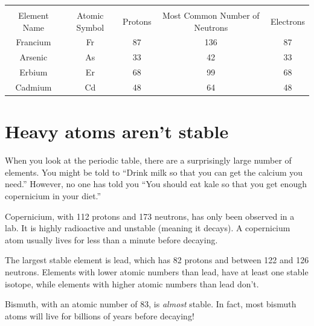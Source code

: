 \begin{Answer}[ref = pne]
\begin{tabular}{|c|c|c|c|c|}
\hline\\
Element Name & Atomic Symbol & Protons & Most Common Number of Neutrons & Electrons\\\hline
 Francium & Fr & 87 & 136 & 87 \\\hline
 Arsenic & As & 33 & 42 & 33 \\\hline
 Erbium & Er & 68 & 99 & 68 \\\hline
 Cadmium & Cd & 48 & 64 & 48 \\\hline
\end{tabular}
\end{Answer}




\section{Heavy atoms aren't stable}

When you look at the periodic table, there are a surprisingly large
number of elements. You might be told to ``Drink milk so that you can
get the calcium you need.'' However, no one has told you ``You should
eat kale so that you get enough copernicium in your diet.''

Copernicium, with 112 protons and 173 neutrons, has only been observed
 in a lab. It is highly radioactive and unstable (meaning it decays). A copernicium
atom usually lives for less than a minute before decaying.

The largest stable element is lead, which has 82 protons and between
122 and 126 neutrons. Elements with lower atomic numbers than lead,
have at least one stable isotope, while elements with higher atomic numbers
than lead don't.

Bismuth, with an atomic number of 83, is \textit{almost} stable. In fact, most
bismuth atoms will live for billions of years before decaying!
